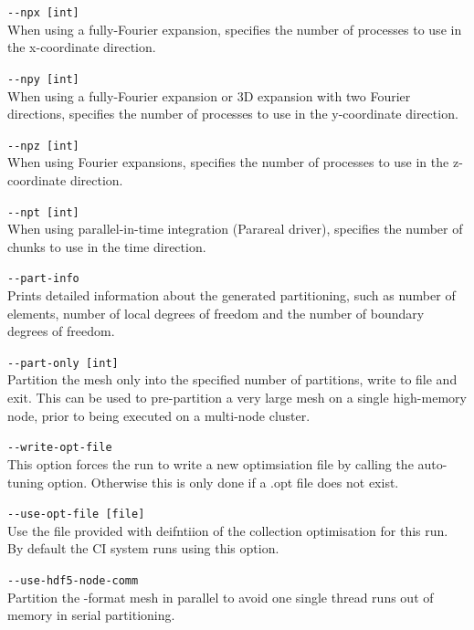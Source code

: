 \lstinline[style=BashInputStyle]{--npx [int]}\\
\hangindent=1.5cm
When using a fully-Fourier expansion, specifies the number of processes to use in the x-coordinate direction.

\lstinline[style=BashInputStyle]{--npy [int]}\\
\hangindent=1.5cm
\quad When using a fully-Fourier expansion or 3D expansion with two Fourier directions, specifies the number of processes to use in the y-coordinate direction.

\lstinline[style=BashInputStyle]{--npz [int]}\\
\hangindent=1.5cm
When using Fourier expansions, specifies the number of processes to use in the z-coordinate direction.

\lstinline[style=BashInputStyle]{--npt [int]}\\
\hangindent=1.5cm
When using parallel-in-time integration (Parareal driver), specifies the number of chunks to use in the time direction.

\lstinline[style=BashInputStyle]{--part-info}\\
\hangindent=1.5cm
Prints detailed information about the generated partitioning, such as number of
elements, number of local degrees of freedom and the number of boundary degrees
of freedom.

\lstinline[style=BashInputStyle]{--part-only [int]}\\
\hangindent=1.5cm
Partition the mesh only into the specified number of partitions, write to file
and exit. This can be used to pre-partition a very large mesh on a single
high-memory node, prior to being executed on a multi-node cluster.


\lstinline[style=BashInputStyle]{--write-opt-file}\\
\hangindent=1.5cm
This option forces the run to write a new optimsiation file by calling
the auto-tuning option. Otherwise this is only done if a .opt file
does not exist.

\lstinline[style=BashInputStyle]{--use-opt-file [file]}\\
\hangindent=1.5cm
Use the file provided with deifntiion of the collection optimisation
for this run. By default the CI system runs using this option.

\lstinline[style=BashInputStyle]{--use-hdf5-node-comm}\\
\hangindent=1.5cm
Partition the -format mesh in parallel to avoid one single thread runs out of memory in serial partitioning.

